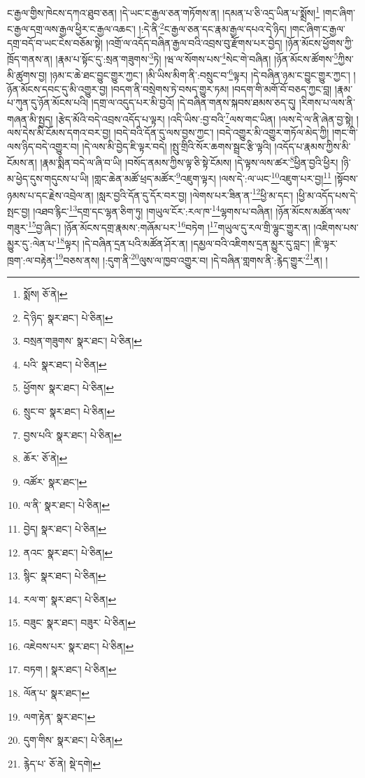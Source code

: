 ང་རྒྱལ་གྱིས་ཁེངས་དཀའ་ཐུབ་ཅན། །དེ་ཡང་ང་རྒྱལ་ཅན་གཏོགས་ན། །དམན་པ་ཅི་འདྲ་ཡིན་པ་སྨྲོས།\footnote{སྨོས།  ཅོ་ནེ། } །གང་ཞིག་ང་རྒྱལ་དགྲ་ལས་རྒྱལ་ཕྱིར་ང་རྒྱལ་འཆང་། །:དེ་ནི་\footnote{དེ་ཉིད་  སྣར་ཐང་།  པེ་ཅིན། }ང་རྒྱལ་ཅན་དང་རྣམ་རྒྱལ་དཔའ་དེ་ཉིད། །གང་ཞིག་ང་རྒྱལ་དགྲ་བདོ་བ་ཡང་ངེས་བཅོམ་སྟེ། །འགྲོ་ལ་འདོད་བཞིན་རྒྱལ་བའི་འབྲས་བུ་རྫོགས་པར་བྱེད། །ཉོན་མོངས་ཕྱོགས་ཀྱི་ཁྲོད་གནས་ན། །རྣམ་པ་སྟོང་དུ་:སྲན་གཟུགས་\footnote{བསྲན་གཟུགས་  སྣར་ཐང་།  པེ་ཅིན། }ཏེ། །ཝ་ལ་སོགས་པས་\footnote{པའི་  སྣར་ཐང་།  པེ་ཅིན། }སེང་གེ་བཞིན། །ཉོན་མོངས་ཚོགས་\footnote{ཕྱོགས་  སྣར་ཐང་།  པེ་ཅིན། }ཀྱིས་མི་ཚུགས་བྱ། །ཉམ་ང་ཆེ་ཐང་བྱུང་གྱུར་ཀྱང་། །མི་ཡིས་མིག་ནི་:བསྲུང་བ་\footnote{སྲུང་བ་  སྣར་ཐང་།  པེ་ཅིན། }ལྟར། །དེ་བཞིན་ཉམ་ང་བྱུང་གྱུར་ཀྱང་། །ཉོན་མོངས་དབང་དུ་མི་འགྱུར་བྱ། །བདག་ནི་བསྲེགས་ཏེ་བསད་གྱུར་ཏམ། །བདག་གི་མགོ་བོ་བཅད་ཀྱང་བླ། །རྣམ་པ་ཀུན་དུ་ཉོན་མོངས་པའི། །དགྲ་ལ་འདུད་པར་མི་བྱའོ། །དེ་བཞིན་གནས་སྐབས་ཐམས་ཅད་དུ། །རིགས་པ་ལས་ནི་གཞན་མི་སྤྱད། །རྩེད་མོའི་བདེ་འབྲས་འདོད་པ་ལྟར། །འདི་ཡིས་:བྱ་བའི་\footnote{བྱས་པའི་  སྣར་ཐང་།  པེ་ཅིན། }ལས་གང་ཡིན། །ལས་དེ་ལ་ནི་ཞེན་བྱ་སྟེ། །ལས་དེས་མི་ངོམས་དགའ་བར་བྱ། །བདེ་བའི་དོན་དུ་ལས་བྱས་ཀྱང་། །བདེ་འགྱུར་མི་འགྱུར་གཏོལ་མེད་ཀྱི། །གང་གི་ལས་ཉིད་བདེ་འགྱུར་བ། །དེ་ལས་མི་བྱེད་ཇི་ལྟར་བདེ། །སྤུ་གྲིའི་སོར་ཆགས་སྦྲང་རྩི་ལྟའི། །འདོད་པ་རྣམས་ཀྱིས་མི་ངོམས་ན། །རྣམ་སྨིན་བདེ་ལ་ཞི་བ་ཡི། །བསོད་ནམས་ཀྱིས་ལྟ་ཅི་སྟེ་ངོམས། །དེ་ལྟས་ལས་ཚར་\footnote{ཆོར་  ཅོ་ནེ། }ཕྱིན་བྱའི་ཕྱིར། །ཉི་མ་ཕྱེད་དུས་གདུངས་པ་ཡི། །གླང་ཆེན་མཚོ་ཕྲད་མཚོར་\footnote{འཚོར་  སྣར་ཐང་། }འཇུག་ལྟར། །ལས་དེ་:ལ་ཡང་\footnote{ལ་ནི་  སྣར་ཐང་།  པེ་ཅིན། }འཇུག་པར་བྱ།\footnote{བྱེད།  སྣར་ཐང་།  པེ་ཅིན། } །སྟོབས་ཉམས་པ་དང་རྗེས་འབྲེལ་ན། །སླར་བྱའི་དོན་དུ་དོར་བར་བྱ། །ལེགས་པར་ཟིན་ན་\footnote{ནའང་  སྣར་ཐང་།  པེ་ཅིན། }ཕྱི་མ་དང་། །ཕྱི་མ་འདོད་པས་དེ་སྤང་བྱ། །འཐབ་རྙིང་\footnote{སྙིང་  སྣར་ཐང་།  པེ་ཅིན། }དགྲ་དང་ལྷན་ཅིག་ཏུ། །གཡུལ་ངོར་:རལ་ཁ་\footnote{རལ་ག་  སྣར་ཐང་།  པེ་ཅིན། }ལྷགས་པ་བཞིན། །ཉོན་མོངས་མཚོན་ལས་གཟུར་\footnote{བཟུང་  སྣར་ཐང་། བཟུར་  པེ་ཅིན། }བྱ་ཞིང་། །ཉོན་མོངས་དགྲ་རྣམས་:གཞོམ་པར་\footnote{འཇེབས་པར་  སྣར་ཐང་།  པེ་ཅིན། }བཏེག །\footnote{བཏག །  སྣར་ཐང་།  པེ་ཅིན། }གཡུལ་དུ་རལ་གྲི་ལྷུང་གྱུར་ན། །འཇིགས་པས་མྱུར་དུ་:ལེན་པ་\footnote{ལོན་པ་  སྣར་ཐང་། }ལྟར། །དེ་བཞིན་དྲན་པའི་མཚོན་ཤོར་ན། །དམྱལ་བའི་འཇིགས་དྲན་མྱུར་དུ་བླང་། །ཇི་ལྟར་ཁྲག་:ལ་བརྟེན་\footnote{ལག་རྟེན་  སྣར་ཐང་། }བཅས་ནས། །:དུག་ནི་\footnote{དུག་གིས་  སྣར་ཐང་།  པེ་ཅིན། }ལུས་ལ་ཁྱབ་འགྱུར་བ། །དེ་བཞིན་གླགས་ནི་:རྙེད་གྱུར་\footnote{རྙེད་པ་  ཅོ་ནེ།  སྡེ་དགེ། }ན། །
